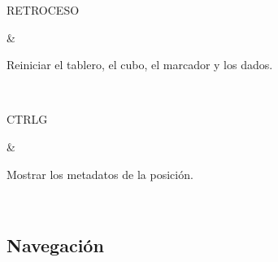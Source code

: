 \documentclass[letterpaper,10pt,spanish]{sphinxmanual}
\begin{document}
\begin{savenotes}
\begin{tabular}[t]{}
\begin{varwidth}[t]{}
\sphinxAtStartPar
RETROCESO
\sphinxbeforeendvarwidth
\end{varwidth}%
&\begin{varwidth}[t]{}
\sphinxAtStartPar
Reiniciar el tablero, el cubo, el marcador y los dados.
\sphinxbeforeendvarwidth
\end{varwidth}%
\\
\sphinxhline\begin{varwidth}[t]{}
\sphinxAtStartPar
CTRL\sphinxhyphen{}G
\sphinxbeforeendvarwidth
\end{varwidth}%
&\begin{varwidth}[t]{}
\sphinxAtStartPar
Mostrar los metadatos de la posición.
\sphinxbeforeendvarwidth
\end{varwidth}%
\\
\sphinxbottomrule
\end{tabular}
\sphinxtableafterendhook\par
\sphinxattableend\end{savenotes}


\subsection{Navegación}
\label{\detokenize{raccourcis:navigation}}\label{\detokenize{raccourcis:raccourcis-navigation}}
\end{document}
